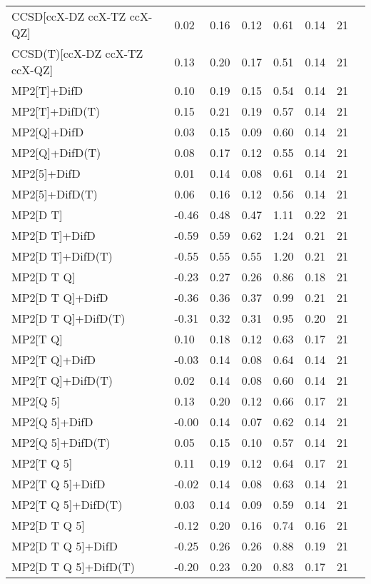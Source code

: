 \begin{table}
\begin{tabular}{l l l l l l l l }
    CCSD[ccX-DZ ccX-TZ ccX-QZ] & 0.02 & 0.16 & 0.12 & 0.61 & 0.14 & 21 \\ 
    CCSD(T)[ccX-DZ ccX-TZ ccX-QZ] & 0.13 & 0.20 & 0.17 & 0.51 & 0.14 & 21 \\ 
    MP2[T]+DifD & 0.10 & 0.19 & 0.15 & 0.54 & 0.14 & 21 \\ 
    MP2[T]+DifD(T) & 0.15 & 0.21 & 0.19 & 0.57 & 0.14 & 21 \\ 
    MP2[Q]+DifD & 0.03 & 0.15 & 0.09 & 0.60 & 0.14 & 21 \\ 
    MP2[Q]+DifD(T) & 0.08 & 0.17 & 0.12 & 0.55 & 0.14 & 21 \\ 
    MP2[5]+DifD & 0.01 & 0.14 & 0.08 & 0.61 & 0.14 & 21 \\ 
    MP2[5]+DifD(T) & 0.06 & 0.16 & 0.12 & 0.56 & 0.14 & 21 \\ 
    MP2[D T] & -0.46 & 0.48 & 0.47 & 1.11 & 0.22 & 21 \\ 
    MP2[D T]+DifD & -0.59 & 0.59 & 0.62 & 1.24 & 0.21 & 21 \\ 
    MP2[D T]+DifD(T) & -0.55 & 0.55 & 0.55 & 1.20 & 0.21 & 21 \\ 
    MP2[D T Q] & -0.23 & 0.27 & 0.26 & 0.86 & 0.18 & 21 \\ 
    MP2[D T Q]+DifD & -0.36 & 0.36 & 0.37 & 0.99 & 0.21 & 21 \\ 
    MP2[D T Q]+DifD(T) & -0.31 & 0.32 & 0.31 & 0.95 & 0.20 & 21 \\ 
    MP2[T Q] & 0.10 & 0.18 & 0.12 & 0.63 & 0.17 & 21 \\ 
    MP2[T Q]+DifD & -0.03 & 0.14 & 0.08 & 0.64 & 0.14 & 21 \\ 
    MP2[T Q]+DifD(T) & 0.02 & 0.14 & 0.08 & 0.60 & 0.14 & 21 \\ 
    MP2[Q 5] & 0.13 & 0.20 & 0.12 & 0.66 & 0.17 & 21 \\ 
    MP2[Q 5]+DifD & -0.00 & 0.14 & 0.07 & 0.62 & 0.14 & 21 \\ 
    MP2[Q 5]+DifD(T) & 0.05 & 0.15 & 0.10 & 0.57 & 0.14 & 21 \\ 
    MP2[T Q 5] & 0.11 & 0.19 & 0.12 & 0.64 & 0.17 & 21 \\ 
    MP2[T Q 5]+DifD & -0.02 & 0.14 & 0.08 & 0.63 & 0.14 & 21 \\ 
    MP2[T Q 5]+DifD(T) & 0.03 & 0.14 & 0.09 & 0.59 & 0.14 & 21 \\ 
    MP2[D T Q 5] & -0.12 & 0.20 & 0.16 & 0.74 & 0.16 & 21 \\ 
    MP2[D T Q 5]+DifD & -0.25 & 0.26 & 0.26 & 0.88 & 0.19 & 21 \\ 
    MP2[D T Q 5]+DifD(T) & -0.20 & 0.23 & 0.20 & 0.83 & 0.17 & 21 \\ 
    \bottomrule
  \end{tabular}
\end{table}
